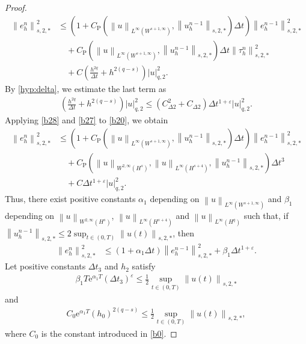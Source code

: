\documentclass[10pt,a4paper]{amsart}
\def\norm#1#2{\left\|#2\right\|_{#1}}
\def\snorm#1#2{\left|#2\right|_{#1}}
\begin{document}
\begin{proof}
\begin{align}
    \norm{s, 2, \ast}{e_h^n}^2 & \leq \left(1 + C_{\mathrm{P}} (\norm{L^{\infty} (W^{s + 1, \infty})}{u}, \norm{s, 2, \ast}{u_h^{n - 1}} ) \Delta t \right) \norm{s, 2, \ast}{e_h^{n - 1}}^2 \\ & \quad + C_{\mathrm{P}} (\norm{L^{\infty} (W^{s + 1, \infty})}{u}, \norm{s, 2, \ast}{u_h^{n - 1}}) \Delta t \norm{s, 2, \ast}{\tau_h^{n}}^2 \\ & \quad + C\left(\frac{h^{2q}}{\Delta t} + h^{2 (q - s)}\right)\snorm{q, 2}{u}^2. \label{b20} 
  \end{align} 
  By \eqref{hyp:delta}, we estimate the last term as 
  \begin{align} 
    \left(\frac{h^{2q}}{\Delta t} + h^{2 (q - s)}\right)\snorm{q, 2}{u}^2 \leq (C_{\Delta 2}^2 + C_{\Delta 2}) \Delta t^{1 + \varepsilon}\snorm{q, 2}{u}^2. \label{b27} 
  \end{align} 
  Applying \eqref{b28} and \eqref{b27} to \eqref{b20}, we obtain 
  \begin{align} 
    \norm{s, 2, \ast}{e_h^n}^2 & \leq \left(1 + C_{\mathrm{P}} (\norm{L^{\infty} (W^{s + 1, \infty})}{u}, \norm{s, 2, \ast}{u_h^{n - 1}} ) \Delta t \right) \norm{s, 2, \ast}{e_h^{n - 1}}^2 \\ 
    & \quad + C_{\mathrm{P}} (\norm{W^{2, \infty}(H^{s})}{u}, \norm{L^{\infty}(H^{s+4})}{u}, \norm{s, 2, \ast}{u_h^{n - 1}}) \Delta t^3 \\ & \quad + C \Delta t^{1 + \varepsilon}\snorm{q, 2}{u}^2. \label{b18}
  \end{align} 
  Thus, there exist positive constants $ \alpha_1 $ depending on $ \norm{L^\infty(W^{s+1, \infty})}{u} $ and $ \beta_1 $ depending on $ \norm{W^{2, \infty}(H^s)}{u} $, $ \norm{L^{\infty}(H^{s + 4})}{u} $ and $ \norm{L^{\infty}(H^q)}{u} $ such that, if $ \norm{s, 2, \ast}{u_h^{n - 1}} \leq 2 \sup_{t\in (0, T)} \norm{s, 2, \ast}{u (t)} $, then 
  \begin{align} 
    \norm{s, 2, \ast}{e_h^n}^2 & \leq \left(1 + \alpha_1 \Delta t \right) \norm{s, 2, \ast}{e_h^{n - 1}}^2 + \beta_1 \Delta t^{1 + \varepsilon}. \label{b15} 
  \end{align} 
  Let positive constants $ \Delta t_3 $ and $ h_2 $ satisfy 
  \begin{align}
    \beta_1 T \mathrm{e}^{\alpha_1 T} (\Delta t_3)^\varepsilon \leq \frac{1}{2} \sup_{t\in (0, T)} \norm{s, 2, \ast}{u (t)} \label{b16} 
  \end{align} 
  and 
  \begin{align} 
    C_0 \mathrm{e}^{\alpha_1 T} (h_0)^{2(q - s)} \leq \frac{1}{2} \sup_{t\in (0, T)} \norm{s, 2, \ast}{u (t)}, \label{b17} 
  \end{align} 
  where $ C_0 $ is the constant introduced in \eqref{b0}. 
  

\end{proof}
\end{document}

